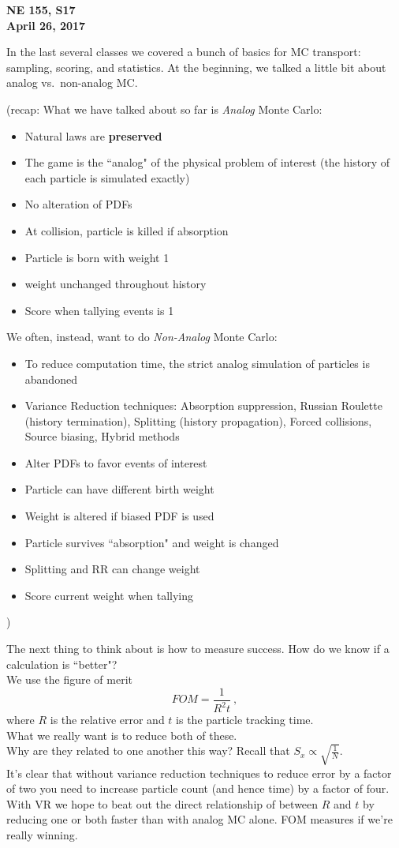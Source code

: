 \documentclass[12pt]{article}
\begin{document}
\begin{center}
{\bf NE 155, S17\\
April 26, 2017 
}
\end{center}

In the last several classes we covered a bunch of basics for MC transport: sampling, scoring, and statistics. At the beginning, we talked a little bit about analog vs.\ non-analog MC.

(recap: What we have talked about so far is \textit{Analog} Monte Carlo:
\begin{itemize}
    \item Natural laws are \textbf{preserved}
    \item The game is the ``analog" of the physical problem of interest (the history of each particle is simulated exactly)
    \item No alteration of PDFs
    \item At collision, particle is killed if absorption
    \item Particle is born with weight 1
    \item weight unchanged throughout history
    \item Score when tallying events is 1
\end{itemize}
%
We often, instead, want to do \textit{Non-Analog} Monte Carlo:
\begin{itemize}
    \item To reduce computation time, the strict analog simulation of particles is abandoned
    \item Variance Reduction techniques: Absorption suppression, Russian Roulette (history termination), Splitting (history propagation), Forced collisions, Source biasing, Hybrid methods
    \item Alter PDFs to favor events of interest
    \item Particle can have different birth weight
    \item Weight is altered if biased PDF is used
    \item Particle survives ``absorption" and weight is changed
    \item Splitting and RR can change weight
    \item Score current weight when tallying
\end{itemize}
)

The next thing to think about is how to measure success. How do we know if a calculation is ``better"?\\
We use the figure of merit
\[
FOM =\frac{1}{R^2 t}\:,
\]
where $R$ is the relative error and $t$ is the particle tracking time.\\
What we really want is to reduce both of these. \\
Why are they related to one another this way? Recall that $S_x \propto \sqrt{\frac{1}{N}}$.\\
It's clear that without variance reduction techniques to reduce error by a factor of two you need to increase particle count (and hence time) by a factor of four.\\
With VR we hope to beat out the direct relationship of between $R$ and $t$ by reducing one or both faster than with analog MC alone. FOM measures if we're really winning.
\end{document}
